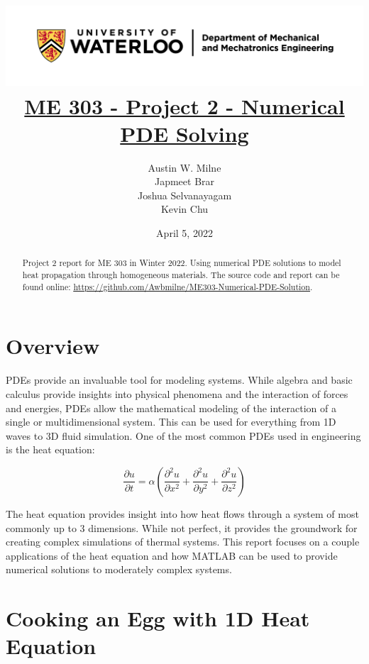 \documentclass[12pt]{article}
\title{
    \includegraphics[width=\linewidth]{resources/uwaterloo_mechanical_and_mechatronics_engineering/UWaterloo_Mechanical_Mechatronics_Eng_Logo_horiz_rgb.png}
    \\[1cm]
    \underline{\bf{ME 303 - Project 2 - Numerical PDE Solving}}
}
\author{
    Austin W. Milne \\
    Japmeet Brar \\
    Joshua Selvanayagam \\
    Kevin Chu
}
\date{April 5, 2022}
\begin{document}
\maketitle
\vfill
\begin{abstract}
    Project 2 report for ME 303 in Winter 2022. Using numerical PDE solutions to model heat propagation through homogeneous materials. The source code and report can be found online:
    \underline{\url{https://github.com/Awbmilne/ME303-Numerical-PDE-Solution}}.
\end{abstract}

\clearpage
{}

\tableofcontents

\clearpage
\listoftables
\listoffigures
\lstlistoflistings

\clearpage
{}
\section{Overview}

PDEs provide an invaluable tool for modeling systems. While algebra and basic calculus provide insights into physical phenomena and the interaction of forces and energies, PDEs allow the mathematical modeling of the interaction of a single or multidimensional system. This can be used for everything from 1D waves to 3D fluid simulation. One of the most common PDEs used in engineering is the heat equation:

\begin{equation}
    \label{eqn:3d_heat_equation}
    \frac{\partial u}{\partial t} = \alpha \left( \frac{\partial^2 u}{\partial x^2} + \frac{\partial^2 u}{\partial y^2} + \frac{\partial^2 u}{\partial z^2} \right)
\end{equation}

\noindent The heat equation provides insight into how heat flows through a system of most commonly up to 3 dimensions. While not perfect, it provides the groundwork for creating complex simulations of thermal systems. This report focuses on a couple applications of the heat equation and how MATLAB can be used to provide numerical solutions to moderately complex systems.
\section{ Cooking an Egg with 1D Heat Equation}
\end{document}
